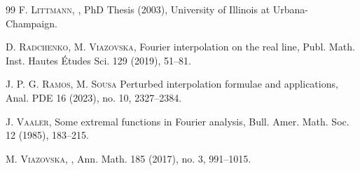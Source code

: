 \documentclass[reqno]{amsart}
\theoremstyle{plain}
\theoremstyle{definition}
\numberwithin{equation}{section}
\begin{document}
\begin{thebibliography}{99}
\textsc{F. Littmann,}
,
\newblock PhD Thesis (2003), University of Illinois at Urbana-Champaign.

\textsc{D. Radchenko, M. Viazovska,} 
\newblock Fourier interpolation on the real line,
\newblock  Publ. Math. Inst. Hautes \'Etudes Sci. 129 (2019), 51--81.

\textsc{J. P. G. Ramos, M. Sousa}
\newblock Perturbed interpolation formulae and applications,
\newblock Anal. PDE 16 (2023), no. 10, 2327--2384.

\textsc{J. Vaaler,}
\newblock Some extremal functions in Fourier analysis, 
\newblock Bull. Amer. Math. Soc. 12 (1985), 183--215.

\textsc{M. Viazovska,}
, 
\newblock Ann. Math. { 185} (2017), no. 3, 991--1015. 

\end{thebibliography}
\end{document}
